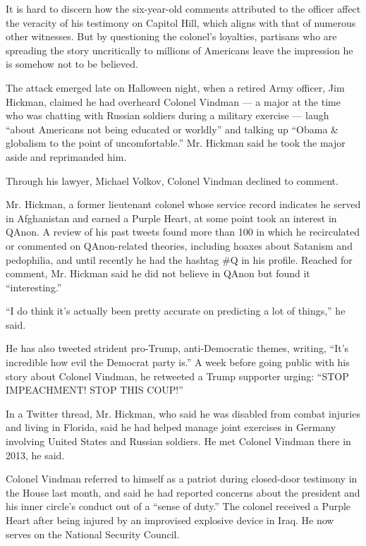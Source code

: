 It is hard to discern how the six-year-old comments attributed to the
officer affect the veracity of his testimony on Capitol Hill, which
aligns with that of numerous other witnesses. But by questioning the
colonel's loyalties, partisans who are spreading the story uncritically
to millions of Americans leave the impression he is somehow not to be
believed.

The attack emerged late on Halloween night, when a retired Army officer,
Jim Hickman, claimed he had overheard Colonel Vindman --- a major at the
time who was chatting with Russian soldiers during a military exercise
--- laugh ``about Americans not being educated or worldly'' and talking
up ``Obama \& globalism to the point of uncomfortable.'' Mr. Hickman
said he took the major aside and reprimanded him.

Through his lawyer, Michael Volkov, Colonel Vindman declined to comment.

Mr. Hickman, a former lieutenant colonel whose service record indicates
he served in Afghanistan and earned a Purple Heart, at some point took
an interest in QAnon. A review of his past tweets found more than 100 in
which he recirculated or commented on QAnon-related theories, including
hoaxes about Satanism and pedophilia, and until recently he had the
hashtag \#Q in his profile. Reached for comment, Mr. Hickman said he did
not believe in QAnon but found it ``interesting.''

``I do think it's actually been pretty accurate on predicting a lot of
things,'' he said.

He has also tweeted strident pro-Trump, anti-Democratic themes, writing,
``It's incredible how evil the Democrat party is.'' A week before going
public with his story about Colonel Vindman, he retweeted a Trump
supporter urging: ``STOP IMPEACHMENT! STOP THIS COUP!''

In a Twitter thread, Mr. Hickman, who said he was disabled from combat
injuries and living in Florida, said he had helped manage joint
exercises in Germany involving United States and Russian soldiers. He
met Colonel Vindman there in 2013, he said.

Colonel Vindman referred to himself as a patriot during closed-door
testimony in the House last month, and said he had reported concerns
about the president and his inner circle's conduct out of a ``sense of
duty.'' The colonel received a Purple Heart after being injured by an
improvised explosive device in Iraq. He now serves on the National
Security Council.

